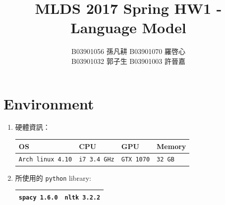 \documentclass[12pt, a4paper]{article}
\title{MLDS 2017 Spring HW1 - Language Model}
\author{B03901056 孫凡耕 B03901070 羅啓心\\
        B03901032 郭子生 B03901003 許晉嘉}
\date{\vspace{-5ex}}
\theoremstyle{mystyle}	%
\begin{document}
\maketitle 
\thispagestyle{empty}
\section{Environment}
\begin{enumerate}
  \item 硬體資訊： 
    \begin{tabular}{|C{4cm}|C{3cm}|C{3cm}|C{3cm}|}
      \hline
      OS & CPU & GPU & Memory \\
      \hline
      \texttt{Arch linux 4.10} & \texttt{i7 3.4 GHz} &
      \texttt{GTX 1070}  & \texttt{32 GB}  \\
      \hline
    \end{tabular}
  \item 所使用的 \texttt{python} library:
    \begin{tabular}{|c|c|}
      \hline
      \texttt{spacy 1.6.0} & \texttt{nltk 3.2.2} \\
      \hline
    \end{tabular}
\end{enumerate}
\end{document}
